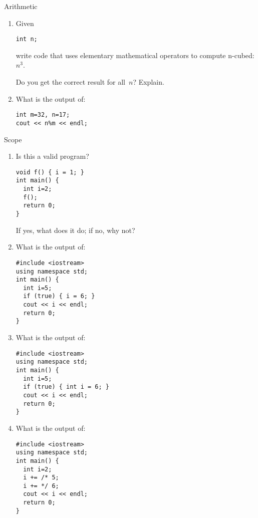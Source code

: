 
 {Arithmetic}

\begin{enumerate}
\item
  Given
\begin{verbatim}
int n;
\end{verbatim}
write code that
uses elementary mathematical operators to compute n-cubed: $n^3$.

Do you get the correct result for all~$n$? Explain.
\item What is the output of:
\begin{verbatim}
int m=32, n=17;
cout << n%m << endl;
\end{verbatim}
\end{enumerate}

 {Scope}

\begin{enumerate}
\item Is this a valid program?
\begin{verbatim}
void f() { i = 1; }
int main() {
  int i=2;
  f();
  return 0;
}
\end{verbatim}
If yes, what does it do; if no, why not?
\item What is the output of:
\begin{verbatim}
#include <iostream>
using namespace std;
int main() {
  int i=5;
  if (true) { i = 6; }
  cout << i << endl;
  return 0;
}
\end{verbatim}
\item What is the output of:
\begin{verbatim}
#include <iostream>
using namespace std;
int main() {
  int i=5;
  if (true) { int i = 6; }
  cout << i << endl;
  return 0;
}
\end{verbatim}
\item What is the output of:
\begin{verbatim}
#include <iostream>
using namespace std;
int main() {
  int i=2;
  i += /* 5;
  i += */ 6;
  cout << i << endl;
  return 0;
}
\end{verbatim}
\end{enumerate}

